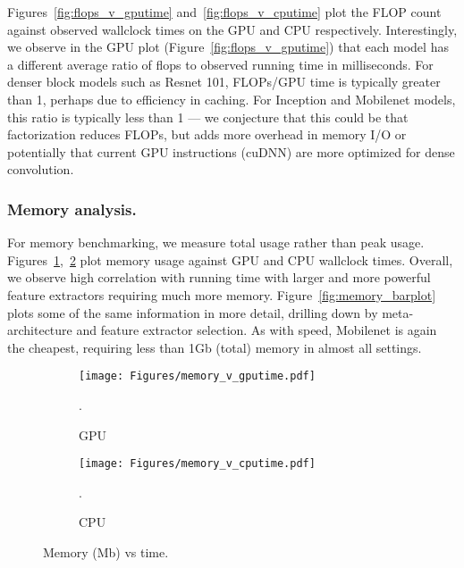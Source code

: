 \documentclass[10pt,twocolumn,letterpaper]{article}
\renewcommand{\paragraph}[1]{\subsubsection{#1}}
\begin{document}
Figures~\ref{fig:flops_v_gputime} and~\ref{fig:flops_v_cputime} plot
the FLOP count against observed wallclock times on the GPU and CPU respectively.
Interestingly,  we observe in the GPU plot (Figure~\ref{fig:flops_v_gputime})
that each model has a different average ratio of flops to observed
running time in milliseconds.  For denser block models such as Resnet
101, FLOPs/GPU time is typically greater than 1, perhaps due to
efficiency in caching. For Inception and Mobilenet models, this ratio
is typically less than 1 --- we conjecture that this could be that
factorization reduces FLOPs, but adds more overhead in memory I/O or
potentially that current GPU instructions (cuDNN) are more optimized
for dense convolution. 



\paragraph{Memory analysis.}






For memory benchmarking, we measure total usage rather than peak
usage.  Figures~\ref{fig:memory_v_gputime},~\ref{fig:memory_v_cputime}
plot memory usage against GPU and CPU wallclock times.  Overall, we
observe high correlation with running time with larger and more
powerful feature extractors requiring much more
memory. Figure~\ref{fig:memory_barplot} plots some of the same
information in more detail, drilling down by meta-architecture and
feature extractor selection.  As with speed, Mobilenet is again the
cheapest, requiring less than 1Gb (total) memory in almost all
settings. 


\begin{figure*}[t!]
{\footnotesize 
  \begin{center}
    \begin{subfigure}{0.48\linewidth}
\texttt{[image: Figures/memory\_v\_gputime.pdf]}
\caption{GPU}.
\label{fig:memory_v_gputime}
\end{subfigure}\qquad
    \begin{subfigure}{0.48\linewidth}
\texttt{[image: Figures/memory\_v\_cputime.pdf]}
\caption{CPU}.
\label{fig:memory_v_cputime}
\end{subfigure}\vspace{-7mm}
  \end{center}
  \caption{\footnotesize Memory (Mb) vs time.}
  \label{fig:memory}
  }
\end{figure*}
\end{document}
